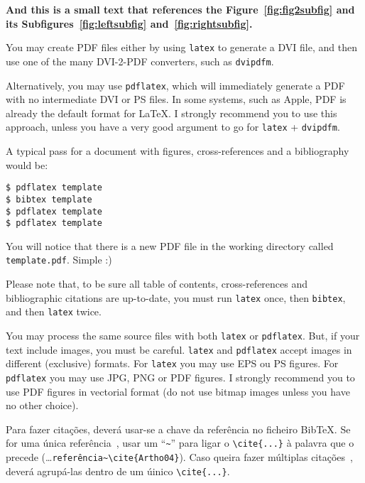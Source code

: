 \textbf{And this is a small text that references the Figure~\ref{fig:fig2subfig} and its Subfigures~\ref{fig:leftsubfig} and~\ref{fig:rightsubfig}.}

\lipsum[1-3]





You may create PDF files either by using \verb!latex! to generate a DVI file, and then use one of the many DVI-2-PDF converters, such as \verb!dvipdfm!.

Alternatively, you may use \verb!pdflatex!, which will immediately generate a PDF with no intermediate DVI or PS files. In some systems, such as Apple, PDF is already the default format for \LaTeX. I strongly recommend you to use this approach, unless you have a very good argument to go for \verb!latex! + \verb!dvipdfm!.

A typical pass for a document with figures, cross-references and a bibliography would be:
\begin{verbatim}
$ pdflatex template
$ bibtex template
$ pdflatex template
$ pdflatex template
\end{verbatim}
You will notice that there is a new PDF file in the working directory called \verb!template.pdf!. Simple :)

Please note that, to be sure all table of contents, cross-references and bibliographic citations are up-to-date, you must run \verb!latex! once, then \verb!bibtex!, and then \verb!latex! twice.



You may process the same source files with both \verb!latex! or \verb!pdflatex!. But, if your text include images, you must be careful. \verb!latex! and \verb!pdflatex! accept images in different (exclusive) formats.  For \verb!latex! you may use EPS ou PS figures. For \verb!pdflatex! you may use JPG, PNG or PDF figures.  I strongly recommend you to use PDF figures in vectorial format (do not use bitmap images unless you have no other choice).




Para fazer citações, deverá usar-se a chave da referência no ficheiro BibTeX. Se for uma única referência~\cite{Artho04}, usar um ``\verb!~!'' para ligar o \verb!\cite{...}! à palavra que o precede (\ldots\verb!referência~\cite{Artho04}!).  Caso queira fazer múltiplas citações~\cite{Shavit95,Silberschatz06,Moss85}, deverá agrupá-las dentro de um úinico \verb!\cite{...}!.

